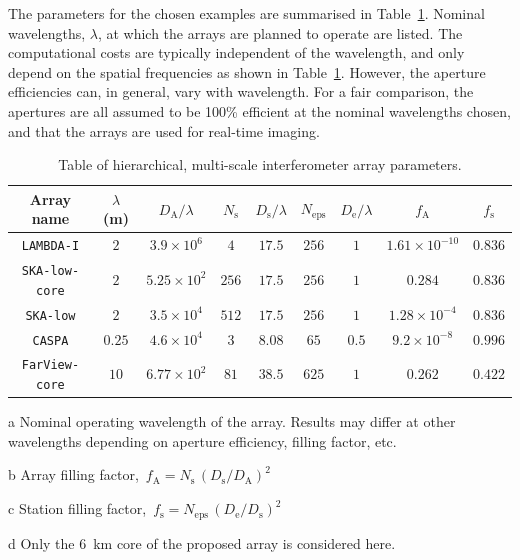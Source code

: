 \documentclass[
  journal=pasa,
  manuscript=article-type,
  year=2020,
  volume=37,
]{cup-journal}
\begin{document}
The parameters for the chosen examples are summarised in Table~\ref{tab:array_params}. Nominal wavelengths, $\lambda$, at which the arrays are planned to operate are listed. The computational costs are typically independent of the wavelength, and only depend on the spatial frequencies as shown in Table~\ref{tab:array_params}. However, the aperture efficiencies can, in general, vary with wavelength. For a fair comparison, the apertures are all assumed to be 100\% efficient at the nominal wavelengths chosen, and that the arrays are used for real-time imaging.

\begin{table}[htb!]
\normalsize
\begin{threeparttable}
\caption{Table of hierarchical, multi-scale interferometer array parameters.}
\label{tab:array_params}
\begin{tabular}{ccccccc|cc}
\toprule
\headrow Array name & $\lambda$ (m)\tnote{a} & $D_\textrm{A}/\lambda$ & $N_\textrm{s}$ & $D_\textrm{s}/\lambda$ & $N_\textrm{eps}$ & $D_\textrm{e}/\lambda$ & $f_\textrm{A}$\tnote{b} & $f_\textrm{s}$\tnote{c} \\
\midrule
\texttt{LAMBDA-I} & $2$ & $3.9\times 10^6$ & $4$ & $17.5$ & $256$ & $1$ &  $1.61\times 10^{-10}$ & $0.836$ \\ 
\texttt{SKA-low-core} & $2$ & $5.25\times 10^{2}$ & $256$ & $17.5$ & $256$ & $1$ & $0.284$ & $0.836$ \\ 
\texttt{SKA-low} & $2$ & $3.5\times 10^4$ & $512$ & $17.5$ & $256$ & $1$ &  $1.28\times 10^{-4}$ & $0.836$ \\ 
\texttt{CASPA} & $0.25$ & $4.6\times 10^4$ & $3$ & $8.08$ & $65$ & $0.5$ &  $9.2\times 10^{-8}$ & $0.996$ \\ 
\texttt{FarView-core}\tnote{d} & $10$ & $6.77\times 10^2$ & $81$ & $38.5$ & $625$ & $1$ & $0.262$ & $0.422$ \\ 
\bottomrule
\end{tabular}
\begin{tablenotes}[hang]
\item[a]Nominal operating wavelength of the array. Results may differ at other wavelengths depending on aperture efficiency, filling factor, etc. 
\item[b]Array filling factor, $\,f_\textrm{A}=N_\textrm{s}\,(D_\textrm{s}/D_\textrm{A})^2$
\item[c]Station filling factor, $\,f_\textrm{s}=N_\textrm{eps}\,(D_\textrm{e}/D_\textrm{s})^2$
\item[d]Only the 6~km core of the proposed array \citep{Polidan+2024} is considered here.
\end{tablenotes}
\end{threeparttable}
\end{table}
\end{document}
